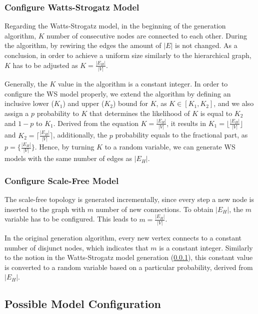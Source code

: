 \subsubsection{Configure Watts-Strogatz Model}\label{sec:watts_generation}

Regarding the Watts-Strogatz model, in the beginning of the generation algorithm, $K$ number of consecutive nodes are connected to each other. During the algorithm, by rewiring the edges the amount of $|E|$ is not changed. As a conclusion, in order to achieve a uniform size similarly to the hierarchical graph, $K$ has to be adjusted as $K = \frac{|E_H|}{|V|}$.

Generally, the $K$ value in the algorithm is a constant integer. In order to configure the WS model properly, we extend the algorithm by defining an inclusive lower ($K_1$) and upper ($K_2$) bound for $K$, as $K\in[K_1, K_2]$, and we also assign a $p$ probability to $K$ that determines the likelihood of $K$ is equal to $K_2$ and $1-p$ to $K_1$. Derived from the equation $K = \frac{|E_H|}{|V|}$, it results in $K_1 = \Big\lfloor\frac{|E_H|}{|V|}\Big\rfloor$ and $K_2 = \Big\lceil\frac{|E_H|}{|V|}\Big\rceil$, additionally, the $p$ probability equals to the fractional part, as $p = \Big\{\frac{|E_H|}{|V|}\Big\}$. Hence, by turning $K$ to a random variable, we can generate WS models with the same number of edges as $|E_H|$.

\subsubsection{Configure Scale-Free Model}

The scale-free topology is generated incrementally, since every step a new node is inserted to the graph with $m$ number of new connections. To obtain $|E_H|$, the $m$ variable has to be configured. This leads to $m = \frac{|E_H|}{|V|}$.

In the original generation algorithm, every new vertex connects to a constant number of disjunct nodes, which indicates that $m$ is a constant integer. Similarly to the notion in the Watts-Strogatz model generation (\ref{sec:watts_generation}), this constant value is converted to a random variable based on a particular probability, derived from $|E_H|$.

\subsection{Possible Model Configuration}

